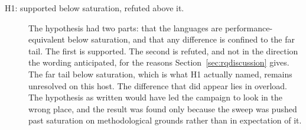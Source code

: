 \documentclass[english,twoside,openright,a4paper,censored,csm,software-track-2020]{HYthesisML}
\begin{document}
\begin{description}
  \item[H1: supported below saturation, refuted above it.]
        The hypothesis had two parts: that the languages are performance-equivalent below
        saturation, and that any difference is confined to the far tail. The first is
        supported. The second is refuted, and not in the direction the wording anticipated,
        for the reasons Section~\ref{sec:rqdiscussion} gives. The far tail below saturation,
        which is what H1 actually named, remains unresolved on this host. The difference that
        did appear lies in overload. The hypothesis as written would have led the campaign to
        look in the wrong place, and the result was found only because the sweep was pushed
        past saturation on methodological grounds rather than in expectation of it.


\end{description}
\end{document}
